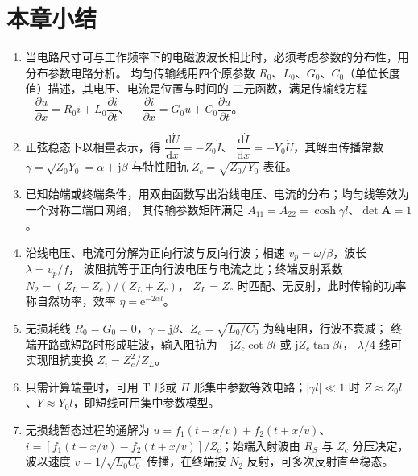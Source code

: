 \section{本章小结}
\begin{enumerate}
  \item 当电路尺寸可与工作频率下的电磁波波长相比时，必须考虑参数的分布性，用分布参数电路分析。
        均匀传输线用四个原参数 $R_0$、$L_0$、$G_0$、$C_0$（单位长度值）描述，其电压、电流是位置与时间的
        二元函数，满足传输线方程 $-\dfrac{\partial u}{\partial x}=R_0i+L_0\dfrac{\partial i}{\partial t}$、
        $-\dfrac{\partial i}{\partial x}=G_0u+C_0\dfrac{\partial u}{\partial t}$。
  \item 正弦稳态下以相量表示，得 $\dfrac{\mathrm{d}\dot{U}}{\mathrm{d}x}=-Z_0\dot{I}$、
        $\dfrac{\mathrm{d}\dot{I}}{\mathrm{d}x}=-Y_0\dot{U}$，其解由传播常数
        $\gamma=\sqrt{Z_0Y_0}=\alpha+\mathrm{j}\beta$ 与特性阻抗 $Z_c=\sqrt{Z_0/Y_0}$ 表征。
  \item 已知始端或终端条件，用双曲函数写出沿线电压、电流的分布；均匀线等效为一个对称二端口网络，
        其传输参数矩阵满足 $A_{11}=A_{22}=\cosh\gamma l$、$\det\boldsymbol{A}=1$。
  \item 沿线电压、电流可分解为正向行波与反向行波；相速 $v_p=\omega/\beta$，波长 $\lambda=v_p/f$，
        波阻抗等于正向行波电压与电流之比；终端反射系数 $N_2=(Z_L-Z_c)/(Z_L+Z_c)$，
        $Z_L=Z_c$ 时匹配、无反射，此时传输的功率称自然功率，效率 $\eta=\mathrm{e}^{-2\alpha l}$。
  \item 无损耗线 $R_0=G_0=0$，$\gamma=\mathrm{j}\beta$、$Z_c=\sqrt{L_0/C_0}$ 为纯电阻，行波不衰减；
        终端开路或短路时形成驻波，输入阻抗为 $-\mathrm{j}Z_c\cot\beta l$ 或 $\mathrm{j}Z_c\tan\beta l$，
        $\lambda/4$ 线可实现阻抗变换 $Z_i=Z_c^2/Z_L$。
  \item 只需计算端量时，可用 T 形或 $\Pi$ 形集中参数等效电路；$|\gamma l|\ll1$ 时
        $Z\approx Z_0l$、$Y\approx Y_0l$，即短线可用集中参数模型。
  \item 无损线暂态过程的通解为 $u=f_1(t-x/v)+f_2(t+x/v)$、
        $i=\left[f_1(t-x/v)-f_2(t+x/v)\right]/Z_c$；始端入射波由 $R_S$ 与 $Z_c$ 分压决定，
        波以速度 $v=1/\sqrt{L_0C_0}$ 传播，在终端按 $N_2$ 反射，可多次反射直至稳态。
\end{enumerate}

\endinput
